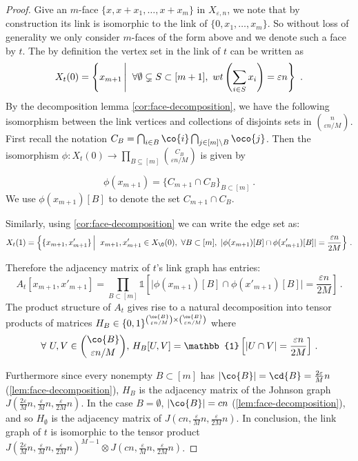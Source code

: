 \documentclass[10pt,a4paper]{article}
\newcommand{\prettyref}[1]{\cref{#1}}
\theoremstyle{definition}
\theoremstyle{remark}
\newcommand{\card}[1]{\lvert#1\rvert}
\newcommand\sett[2]{\left\{ #1 \left| \; \vphantom{#1 #2} \right. #2  \right\}}
\numberwithin{equation}{section}
\let\pref=\prettyref
\begin{document}
\begin{proof}
    Give an $m$-face $\{x,x+x_1,\dots,x+x_m\}$ in $X_{\varepsilon, n}$, we note that by construction its link is isomorphic to the link of $\{0,x_1,\dots,x_m\}$. So without loss of generality we only consider $m$-faces of the form above and we denote such a face by $t$.
    The by definition the vertex set in the link of $t$ can be written as 
    \[X_t(0) =\sett{x_{m+1}}{\forall \emptyset\subsetneq S \subset[m+1], ~wt\left(\sum_{i\in S} x_i\right) = \varepsilon n}~. \]
    By the decomposition lemma \pref{cor:face-decomposition}, we have the following isomorphism between the link vertices and collections of disjoints sets in $\binom{n}{\varepsilon n/M}$. First recall the notation $C_B = \bigcap_{i\in B} \co{i}  \bigcap_{j\in [m]\setminus B}\oco{j}$. Then the isomorphism $\phi: X_t(0) \to \prod_{B\subseteq [m]} \binom{C_B}{\varepsilon n/M}$ is given by 
    
    \[ \phi(x_{m+1}) = \{ C_{m+1}\cap C_B \}_{B\subset[m]} ~.\]
    We use $\phi(x_{m+1})[B]$ to denote the set $C_{m+1}\cap C_B$.
    
    Similarly, using \pref{cor:face-decomposition} we can write the edge set as:
    \[X_{t}(1) =\sett{ \{x_{m+1},x'_{m+1}\} }{ x_{m+1},x'_{m+1}  \in X_\0(0),~ \forall B\subset [m],~ \card{\phi(x_{m+1})[B]\cap \phi(x'_{m+1})[B]} = \frac{\varepsilon n}{2M} }     \,.\]
    
    Therefore the adjacency matrix of $t$'s link graph has entries:
    \[A_{t}\left[ x_{m+1},x'_{m+1} \right] = \prod_{B \subset [m]} \mathbb{1}\left[\card{\phi(x_{m+1})[B]\cap \phi(x'_{m+1})[B]}  = \frac{\varepsilon n}{2M}  \right] \,.\]
    The product structure of $A_{t}$ gives rise to a natural decomposition into tensor products of matrices $H_B \in \{0,1\}^{ \binom{\co{B}}{\varepsilon n / M} \times \binom{\co{B}}{\varepsilon n / M} }$ where 
    \[ \forall~ U,V \in \binom{\co{B}}{\varepsilon n / M}, \,H_B[U,V] = \mathbb{1}\left[ \card{U\cap V} = \frac{\varepsilon n}{2M}   \right] \,.\]

    Furthermore since every nonempty $B\subset [m]$ has $\card{\co{B}} =\cd{B} = \frac{2\varepsilon}{M} n$ (\pref{lem:face-decomposition}), $H_B$ is the adjacency matrix of the Johnson graph $J(\frac{2\varepsilon}{M}n,\frac{\varepsilon}{M}n,\frac{\varepsilon}{2M}n)$. 
    In the case $B = \emptyset$, $\card{\co{B}} = cn$ (\pref{lem:face-decomposition}), and so $H_\emptyset$ is the adjacency matrix of $J(cn,\frac{\varepsilon}{M}n,\frac{\varepsilon}{2M}n)$. In conclusion, the link graph of $t$ is isomorphic to the tensor product \(J(\frac{2\varepsilon}{M}n,\frac{\varepsilon}{M}n,\frac{\varepsilon}{2M}n)^{M-1} \otimes J(cn,\frac{\varepsilon}{M}n,\frac{\varepsilon}{2M}n)\).
\end{proof}
\end{document}
